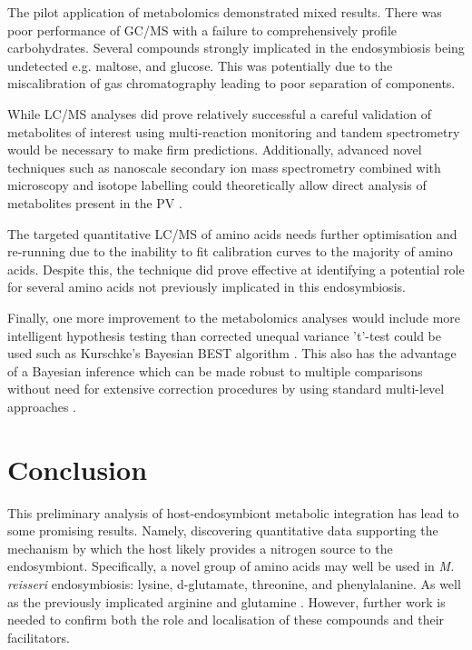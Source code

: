 The pilot application of metabolomics demonstrated mixed results.
There was poor performance of GC/MS with a failure to
comprehensively profile carbohydrates. Several 
compounds strongly implicated in the endosymbiosis
being undetected e.g. maltose, and glucose.  This was potentially
due to the miscalibration of gas chromatography leading to poor 
separation of components. 

While LC/MS analyses did prove relatively successful a careful
validation of metabolites of interest using multi-reaction monitoring
and tandem spectrometry would be necessary to make firm predictions.
Additionally, advanced novel techniques such as nanoscale 
secondary ion mass spectrometry combined with 
microscopy and isotope labelling could theoretically allow direct analysis 
of metabolites present in the PV \citep{Kopp2015,Legin2014}.

The targeted quantitative LC/MS of amino acids needs further optimisation
and re-running due to the inability to fit calibration curves to the majority
of amino acids. Despite this, the technique did prove effective at identifying 
a potential role for several amino acids not previously implicated in this
endosymbiosis.

Finally, one more improvement to the metabolomics analyses 
would include more intelligent hypothesis testing than corrected unequal variance 't'-test
could be used such as Kurschke's Bayesian BEST algorithm \citep{Kruschke2013}.
This also has the advantage of a Bayesian inference which can be 
made robust to multiple comparisons without need for extensive correction
procedures by using standard multi-level approaches \citep{Gelman2009}.


\section{Conclusion}

This preliminary analysis of host-endosymbiont metabolic integration 
has lead to some promising results.
Namely, discovering quantitative data supporting the mechanism by which
the host likely provides a nitrogen source to the endosymbiont. 
Specifically, a novel group of amino acids may well be used in 
\textit{M. reisseri} endosymbiosis: lysine, d-glutamate, 
threonine, and phenylalanine. As well as the previously implicated
arginine and glutamine \citep{Kato2009a}.
However, further work is needed to confirm both the role and localisation of
these compounds and their facilitators.

